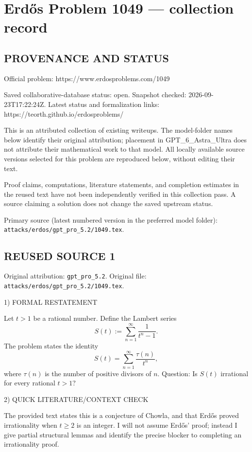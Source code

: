 \section*{Erd\H{o}s Problem 1049 --- collection record}

\subsection*{PROVENANCE AND STATUS}
Official problem: https://www.erdosproblems.com/1049

Saved collaborative-database status: open.
Snapshot checked: 2026-09-23T17:22:24Z.
Latest status and formalization links: https://teorth.github.io/erdosproblems/

This is an attributed collection of existing writeups. The model-folder names below identify their original attribution; placement in GPT\_6\_Astra\_Ultra does not attribute their mathematical work to that model. All locally available source versions selected for this problem are reproduced below, without editing their text.

Proof claims, computations, literature statements, and completion estimates in the reused text have not been independently verified in this collection pass. A source claiming a solution does not change the saved upstream status.

Primary source (latest numbered version in the preferred model folder): \texttt{attacks/erdos/gpt\_pro\_5.2/1049.tex}.

\subsection*{REUSED SOURCE 1}
Original attribution: \texttt{gpt\_pro\_5.2}.
Original file: \texttt{attacks/erdos/gpt\_pro\_5.2/1049.tex}.


1) FORMAL RESTATEMENT

Let $t>1$ be a rational number.
Define the Lambert series
\[
  S(t):=\sum_{n=1}^\infty \frac{1}{t^n-1}.
\]
The problem states the identity
\[
  S(t)=\sum_{n=1}^\infty \frac{\tau(n)}{t^n},
\]
where $\tau(n)$ is the number of positive divisors of $n$.
Question: Is $S(t)$ irrational for every rational $t>1$?

2) QUICK LITERATURE/CONTEXT CHECK

The provided text states this is a conjecture of Chowla, and that Erd\H{o}s proved irrationality when
$t\ge 2$ is an integer. I will not assume Erd\H{o}s' proof; instead I give partial structural lemmas
and identify the precise blocker to completing an irrationality proof.

